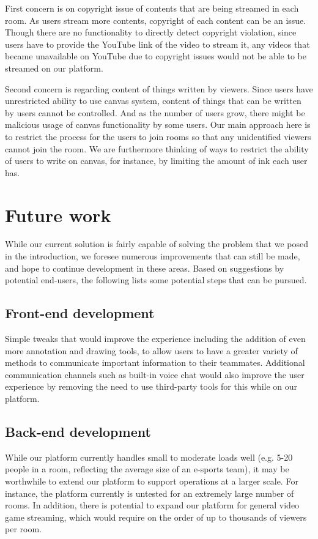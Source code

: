 \documentclass[conference]{IEEEtran}
\begin{document}
    First concern is on copyright issue of contents that are being streamed in each room. As users stream more contents, copyright of each content can be an issue. Though there are no functionality to directly detect copyright violation, since users have to provide the YouTube link of the video to stream it, any videos that became unavailable on YouTube due to copyright issues would not be able to be streamed on our platform.

    Second concern is regarding content of things written by viewers. Since users have unrestricted ability to use canvas system, content of things that can be written by users cannot be controlled. And as the number of users grow, there might be malicious usage of canvas functionality by some users. Our main approach here is to restrict the process for the users to join rooms so that any unidentified viewers cannot join the room. We are furthermore thinking of ways to restrict the ability of users to write on canvas, for instance, by limiting the amount of ink each user has.
\section{Future work}

    While our current solution is fairly capable of solving the problem that we posed in the introduction, we foresee numerous improvements that can still be made, and hope to continue development in these areas. Based on suggestions by potential end-users, the following lists some potential steps that can be pursued.

\subsection{Front-end development}

    Simple tweaks that would improve the experience including the addition of even more annotation and drawing tools, to allow users to have a greater variety of methods to communicate important information to their teammates. Additional communication channels such as built-in voice chat would also improve the user experience by removing the need to use third-party tools for this while on our platform.

\subsection{Back-end development}

    While our platform currently handles small to moderate loads well (e.g. 5-20 people in a room, reflecting the average size of an e-sports team), it may be worthwhile to extend our platform to support operations at a larger scale. For instance, the platform currently is untested for an extremely large number of rooms. In addition, there is potential to expand our platform for general video game streaming, which would require on the order of up to thousands of viewers per room.
\end{document}
